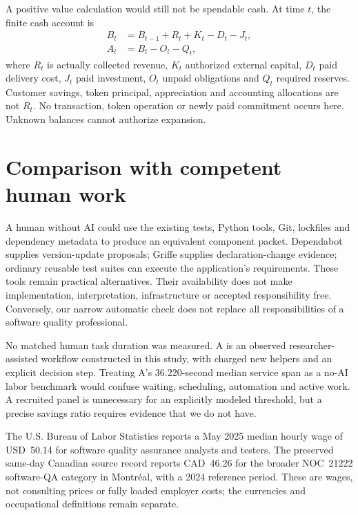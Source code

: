 \documentclass[11pt,a4paper]{article}
\begin{document}
A positive value calculation would still not be spendable cash. At time $t$, the finite cash account is
\begin{align}
B_t &= B_{t-1}+R_t+K_t-D_t-J_t,\\
A_t &= B_t-O_t-Q_t,
\end{align}
where $R_t$ is actually collected revenue, $K_t$ authorized external capital, $D_t$ paid delivery cost, $J_t$ paid investment, $O_t$ unpaid obligations and $Q_t$ required reserves. Customer savings, token principal, appreciation and accounting allocations are not $R_t$. No transaction, token operation or newly paid commitment occurs here. Unknown balances cannot authorize expansion.\cite{economics,ecosystem}

\section{Comparison with competent human work}
\label{sec:human}

A human without AI could use the existing tests, Python tools, Git, lockfiles and dependency metadata to produce an equivalent component packet. Dependabot supplies version-update proposals; Griffe supplies declaration-change evidence; ordinary reusable test suites can execute the application's requirements. These tools remain practical alternatives. Their availability does not make implementation, interpretation, infrastructure or accepted responsibility free. Conversely, our narrow automatic check does not replace all responsibilities of a software quality professional.\cite{dependabot,griffe,human}

No matched human task duration was measured. A is an observed researcher-assisted workflow constructed in this study, with charged new helpers and an explicit decision step. Treating A's 36.220-second median service span as a no-AI labor benchmark would confuse waiting, scheduling, automation and active work. A recruited panel is unnecessary for an explicitly modeled threshold, but a precise savings ratio requires evidence that we do not have.

The U.S. Bureau of Labor Statistics reports a May 2025 median hourly wage of USD~50.14 for software quality assurance analysts and testers. The preserved same-day Canadian source record reports CAD~46.26 for the broader NOC~21222 software-QA category in Montr\'eal, with a 2024 reference period. These are wages, not consulting prices or fully loaded employer costs; the currencies and occupational definitions remain separate.\cite{bls,jobbank,human}
\end{document}

